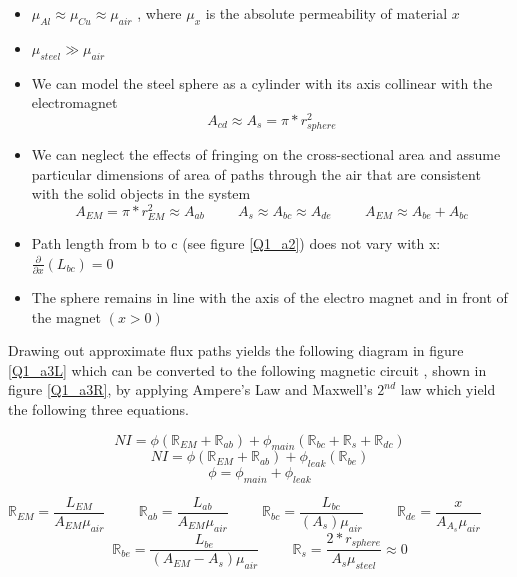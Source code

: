 \documentclass{article}
\theoremstyle{plain}
\theoremstyle{definition}
\theoremstyle{remark}
\begin{document}
\begin{itemize}
\item $ \mu_{Al} \approx \mu_{Cu} \approx \mu_{air} $ , where $\mu_x$ is the absolute permeability of material $x$
\item $ \mu_{steel} \gg \mu_{air} $
\item We can model the steel sphere as a cylinder with its axis collinear with the electromagnet  \\ 
$$A_{cd} \approx A_{s} = \pi * r_{sphere}^2 $$ 
\item We can neglect the effects of fringing on the cross-sectional area and assume particular dimensions of area of paths through the air that are consistent with the solid objects in the system \\
$$ A_{EM} = \pi*r_{EM}^2 \approx A_{ab} \hspace{1cm} A_{s} \approx A_{bc} \approx A_{de} \hspace{1cm} A_{EM} \approx A_{be} + A_{bc} $$ 
\item Path length from b to c (see figure \ref{Q1_a2}) does not vary with x: 
$ \frac{\partial}{\partial x} (L_{bc}) = 0$
\item The sphere remains in line with the axis of the electro magnet and in front of the magnet $( x > 0 )$
\end{itemize}

Drawing out approximate flux paths yields the following diagram in figure \ref{Q1_a3L} which can be converted to the following magnetic circuit , shown in figure \ref{Q1_a3R}, by applying Ampere's Law and Maxwell's $2^{nd}$ law which yield the following three equations. 

$$ NI = \phi \left (\mathbb{R}_{EM} + \mathbb{R}_{ab}\right) + \phi_{main} \left( \mathbb{R}_{bc}+\mathbb{R}_{s}+\mathbb{R}_{dc} \right) $$
$$ NI = \phi \left( \mathbb{R}_{EM} + \mathbb{R}_{ab} \right) + \phi_{leak} \left( \mathbb{R}_{be} \right) $$
$$ \phi = \phi_{main} + \phi_{leak} $$


$$ \mathbb{R}_{EM} = \frac{L_{EM}}{A_{EM}\mu_{air}}  \hspace{1cm} \mathbb{R}_{ab} = \frac{L_{ab}}{A_{EM}\mu_{air}} \hspace{1cm} \mathbb{R}_{bc} = \frac{L_{bc}}{(A_{s})\mu_{air}} \hspace{1cm} \mathbb{R}_{de} = \frac{x}{A_{A_{s}}\mu_{air}} \hspace{1cm} $$ $$ \mathbb{R}_{be} = \frac{L_{be}}{(A_{EM} - A_{s})\mu_{air}}  \hspace{1cm}  \mathbb{R}_{s} = \frac{2*r_{sphere}}{A_{s}\mu_{steel}} \approx 0$$
\end{document}

